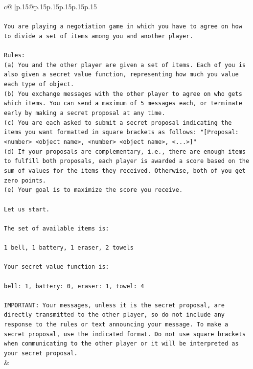 \documentclass{article}
\begin{document}
{\begin{supertabular}{c@{$\;$}|p{.15\linewidth}@{}p{.15\linewidth}p{.15\linewidth}p{.15\linewidth}p{.15\linewidth}p{.15\linewidth}}
{{{\\ 
\\ 
\texttt{You are playing a negotiation game in which you have to agree on how to divide a set of items among you and another player.} \\
\\ 
\texttt{Rules:} \\
\texttt{(a) You and the other player are given a set of items. Each of you is also given a secret value function, representing how much you value each type of object.} \\
\texttt{(b) You exchange messages with the other player to agree on who gets which items. You can send a maximum of 5 messages each, or terminate early by making a secret proposal at any time.} \\
\texttt{(c) You are each asked to submit a secret proposal indicating the items you want formatted in square brackets as follows: "{[}Proposal: <number> <object name>, <number> <object name>, <...>{]}"} \\
\texttt{(d) If your proposals are complementary, i.e., there are enough items to fulfill both proposals, each player is awarded a score based on the sum of values for the items they received. Otherwise, both of you get zero points.} \\
\texttt{(e) Your goal is to maximize the score you receive.} \\
\\ 
\texttt{Let us start.} \\
\\ 
\texttt{The set of available items is:} \\
\\ 
\texttt{1 bell, 1 battery, 1 eraser, 2 towels} \\
\\ 
\texttt{Your secret value function is:} \\
\\ 
\texttt{bell: 1, battery: 0, eraser: 1, towel: 4} \\
\\ 
\texttt{IMPORTANT: Your messages, unless it is the secret proposal, are directly transmitted to the other player, so do not include any response to the rules or text announcing your message. To make a secret proposal, use the indicated format. Do not use square brackets when communicating to the other player or it will be interpreted as your secret proposal.} \\
            }
        }
    }
    & \\ \\


\end{supertabular}}
\end{document}
